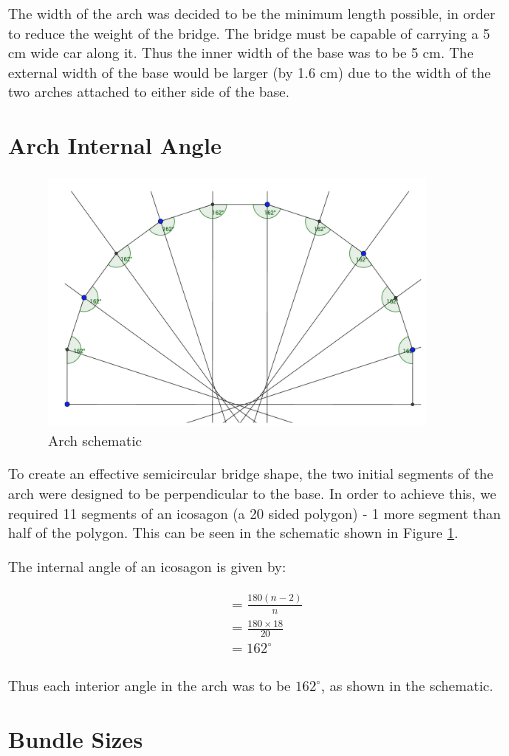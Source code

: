 \documentclass[a4paper,11pt]{article}
\begin{document}
The width of the arch was decided to be the minimum length possible, in order to
reduce the weight of the bridge.
The bridge must be capable of carrying a 5 cm wide car along it.
Thus the inner width of the base was to be 5 cm.
The external width of the base would be larger (by 1.6 cm) due to the width of
the two arches attached to either side of the base.


\subsection{Arch Internal Angle}

\begin{figure}
\begin{center}
\includegraphics[width=10cm]{figures/schematic.png}
\end{center}
\caption{Arch schematic}
\label{construction:schematic}
\end{figure}

To create an effective semicircular bridge shape, the two initial segments of
the arch were designed to be perpendicular to the base.
In order to achieve this, we required 11 segments of an icosagon (a 20 sided
polygon) - 1 more segment than half of the polygon.
This can be seen in the schematic shown in Figure \ref{construction:schematic}.

The internal angle of an icosagon is given by:

$$
\begin{aligned}
& = \frac{180(n - 2)}{n} \\
& = \frac{180 \times 18}{20} \\
& = 162^\circ \\
\end{aligned}
$$

Thus each interior angle in the arch was to be $162^\circ$, as shown in the
schematic.


\subsection{Bundle Sizes}
\end{document}
